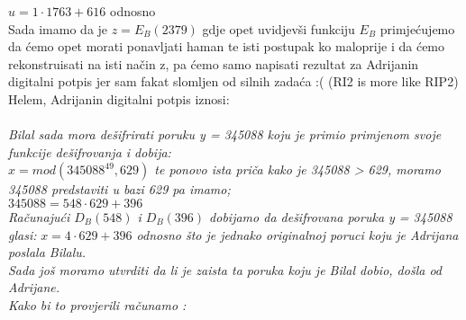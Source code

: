 \documentclass[12pt]{article}
\begin{document}
\begin{enumerate}
\begin{center}
{        \vspace{0.15cm} $u = 1\cdot1763 + 616$ odnosno
        \\ \vspace{0.2cm}
        Sada imamo da je $z = E_B(2379)$ gdje opet uvidjevši funkciju $E_B$ primjećujemo da ćemo opet morati ponavljati haman te isti postupak ko maloprije i da ćemo rekonstruisati na isti način z, pa ćemo samo napisati rezultat za Adrijanin digitalni potpis jer sam fakat slomljen od silnih zadaća :( (RI2 is more like RIP2)\\ \vspace{0.15cm} Helem, Adrijanin digitalni potpis iznosi: \\ \vspace{0.15cm} 
        \\ \vspace{0.3cm}
        }    
         \textit{Bilal sada mora dešifrirati poruku y = 345088 koju je primio primjenom svoje funkcije dešifrovanja i dobija:\\
         $x = mod(345088^{49},629)$ te ponovo ista priča kako je 345088 > 629, moramo 345088 predstaviti u bazi 629 pa imamo; \\ \vspace{0.15cm} $345088 = 548\cdot629 + 396$\\ \vspace{0.15cm} Računajući $D_B(548)$ i $D_B(396)$ dobijamo da dešifrovana poruka y = 345088 glasi: }
         \vspace{0.25cm}
         \textit{$x = 4\cdot629 + 396$ odnosno  što je jednako originalnoj poruci koju je Adrijana poslala Bilalu.
         \\ \vspace{0.2cm} Sada još moramo utvrditi da li je zaista ta poruka koju je Bilal dobio, došla od Adrijane. \\ Kako bi to provjerili računamo :
         \\
         }
        

\end{center}
\end{enumerate}
\end{document}
